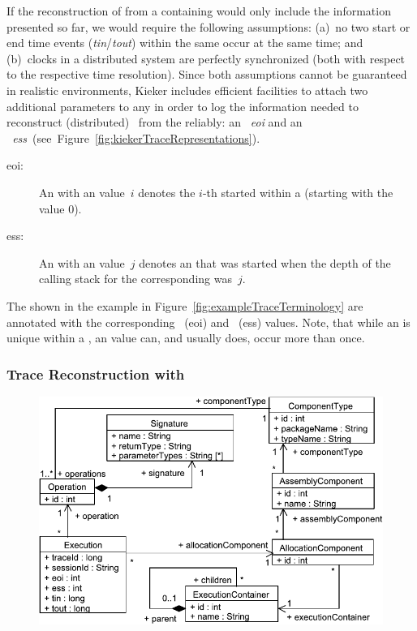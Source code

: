 If the reconstruction of \traces{} from a \MonitoringLog{} containing \KiekerExecutionRecords{} %
would only include the \trace{} information presented so far, we would require the %
following assumptions: %
(a)~no two \execution{} start or end time events %
(\textit{tin}/\textit{tout}) within the same \trace{} occur at the same time; %
and (b)~clocks in a distributed system are perfectly synchronized (both with %
respect to the respective time resolution). %
Since both assumptions cannot be guaranteed in realistic environments, %
Kieker includes efficient facilities to attach two additional parameters to any %
\KiekerExecutionRecord{} in order to log the information needed to %
reconstruct (distributed)~\traces{} from the \MonitoringLog{} reliably: %
an \textit{\eoiLong{}~eoi} and an \textit{\essLong{}~ess}~(see~Figure~\ref{fig:kiekerTraceRepresentations}). %
\begin{description}
\item[eoi:] An \execution{} with an \eoiLong{} value~$i$ denotes the $i$-th %
\execution{} started within a \trace{} (starting with the value $0$).
\item[ess:] An \execution{} with an \essLong{} value~$j$ denotes an \execution{} that %
was started when the depth of the calling stack for the corresponding \trace{} was~$j$.
\end{description}

\noindent The \executions{} shown in the example \trace{} in Figure~\ref{fig:exampleTraceTerminology} 
are annotated with the corresponding \eoiLong{}~(eoi) and \essLong{}~(ess) values. %
Note, that while an \eoiLong{} is unique within a \trace{}, an \essLong{} %
value can, and usually does, occur more than once. %

\subsubsection{Trace Reconstruction with \KiekerTpan{}}

\begin{figure}\centering
\includegraphics[scale=0.65]{figures/model/kieker_systemmodel-crop}
\end{figure}


